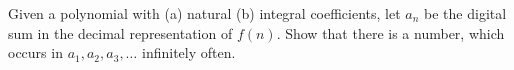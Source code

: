Given a polynomial with (a) natural (b) integral coefficients, let $a_n$ be the digital sum in the decimal representation of $f(n)$. Show that there is a number, which occurs in $a_1, a_2, a_3, \ldots$ infinitely often.
